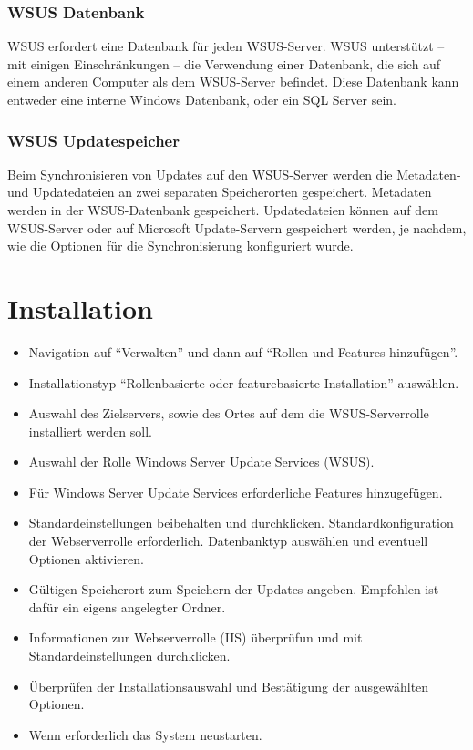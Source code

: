 \documentclass[a4paper,11pt]{article}
\begin{document}
\subsubsection{WSUS Datenbank}
WSUS erfordert eine Datenbank für jeden WSUS-Server. WSUS unterstützt – mit einigen Einschränkungen – die Verwendung einer Datenbank, die sich auf einem anderen Computer als dem WSUS-Server befindet.
Diese Datenbank kann entweder eine interne Windows Datenbank, oder ein SQL Server sein.
\subsubsection{WSUS Updatespeicher}
Beim Synchronisieren von Updates auf den WSUS-Server werden die Metadaten- und Updatedateien an zwei separaten Speicherorten gespeichert. Metadaten werden in der WSUS-Datenbank gespeichert. 
Updatedateien können auf dem WSUS-Server oder auf Microsoft Update-Servern gespeichert werden, je nachdem, wie die Optionen für die Synchronisierung konfiguriert wurde.

\section{Installation}
\begin{itemize}
 \item Navigation auf ``Verwalten'' und dann auf ``Rollen und Features hinzufügen''.
 \item Installationstyp ``Rollenbasierte oder featurebasierte Installation'' ausw\"ahlen.
 \item Auswahl des Zielservers, sowie des Ortes auf dem die WSUS-Serverrolle installiert werden soll.
 \item Auswahl der Rolle Windows Server Update Services (WSUS).
 \item Für Windows Server Update Services erforderliche Features hinzugefügen.
 \item Standardeinstellungen beibehalten und durchklicken.
  \subitem Standardkonfiguration der Webserverrolle erforderlich.
  \subitem Datenbanktyp auswählen und eventuell Optionen aktivieren.
 \item Gültigen Speicherort zum Speichern der Updates angeben. Empfohlen ist daf\"ur ein eigens angelegter Ordner.
 \item Informationen zur Webserverrolle (IIS) \"uberpr\"ufun und mit Standardeinstellungen durchklicken.
 \item Überprüfen der Installationsauswahl und Bestätigung der ausgewählten Optionen.
 \item Wenn erforderlich das System neustarten.
\end{itemize}
\end{document}
